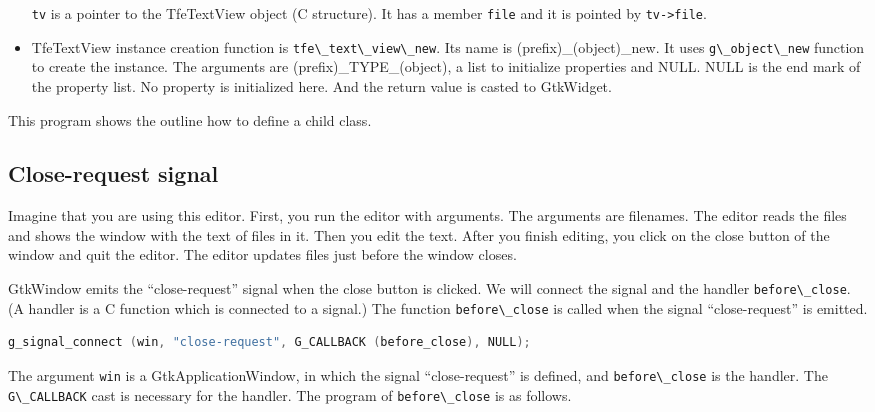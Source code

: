 \begin{itemize}
  \passthrough{\lstinline!tv!} is a pointer to the TfeTextView object (C
  structure). It has a member \passthrough{\lstinline!file!} and it is
  pointed by \passthrough{\lstinline!tv->file!}.
\item
  TfeTextView instance creation function is
  \passthrough{\lstinline!tfe\_text\_view\_new!}. Its name is
  (prefix)\_(object)\_new. It uses
  \passthrough{\lstinline!g\_object\_new!} function to create the
  instance. The arguments are (prefix)\_TYPE\_(object), a list to
  initialize properties and NULL. NULL is the end mark of the property
  list. No property is initialized here. And the return value is casted
  to GtkWidget.
\end{itemize}

This program shows the outline how to define a child class.

\subsection{Close-request signal}\label{close-request-signal}

Imagine that you are using this editor. First, you run the editor with
arguments. The arguments are filenames. The editor reads the files and
shows the window with the text of files in it. Then you edit the text.
After you finish editing, you click on the close button of the window
and quit the editor. The editor updates files just before the window
closes.

GtkWindow emits the ``close-request'' signal when the close button is
clicked. We will connect the signal and the handler
\passthrough{\lstinline!before\_close!}. (A handler is a C function
which is connected to a signal.) The function
\passthrough{\lstinline!before\_close!} is called when the signal
``close-request'' is emitted.

\begin{lstlisting}[language=C]
g_signal_connect (win, "close-request", G_CALLBACK (before_close), NULL);
\end{lstlisting}

The argument \passthrough{\lstinline!win!} is a GtkApplicationWindow, in
which the signal ``close-request'' is defined, and
\passthrough{\lstinline!before\_close!} is the handler. The
\passthrough{\lstinline!G\_CALLBACK!} cast is necessary for the handler.
The program of \passthrough{\lstinline!before\_close!} is as follows.

